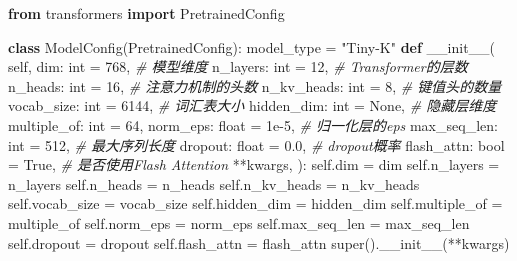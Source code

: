 \documentclass[
]{article}
\newenvironment{Shaded}{}{}
\newcommand{\BuiltInTok}[1]{\textcolor[rgb]{0.00,0.50,0.00}{#1}}
\newcommand{\CommentTok}[1]{\textcolor[rgb]{0.38,0.63,0.69}{\textit{#1}}}
\newcommand{\DecValTok}[1]{\textcolor[rgb]{0.25,0.63,0.44}{#1}}
\newcommand{\FloatTok}[1]{\textcolor[rgb]{0.25,0.63,0.44}{#1}}
\newcommand{\FunctionTok}[1]{\textcolor[rgb]{0.02,0.16,0.49}{#1}}
\newcommand{\ImportTok}[1]{\textcolor[rgb]{0.00,0.50,0.00}{\textbf{#1}}}
\newcommand{\KeywordTok}[1]{\textcolor[rgb]{0.00,0.44,0.13}{\textbf{#1}}}
\newcommand{\NormalTok}[1]{#1}
\newcommand{\OperatorTok}[1]{\textcolor[rgb]{0.40,0.40,0.40}{#1}}
\newcommand{\StringTok}[1]{\textcolor[rgb]{0.25,0.44,0.63}{#1}}
\newcommand{\VariableTok}[1]{\textcolor[rgb]{0.10,0.09,0.49}{#1}}
\begin{document}
\begin{Shaded}
\begin{Highlighting}[]
\ImportTok{from}\NormalTok{ transformers }\ImportTok{import}\NormalTok{ PretrainedConfig}

\KeywordTok{class}\NormalTok{ ModelConfig(PretrainedConfig):}
\NormalTok{    model\_type }\OperatorTok{=} \StringTok{"Tiny{-}K"}
    \KeywordTok{def} \FunctionTok{\_\_init\_\_}\NormalTok{(}
            \VariableTok{self}\NormalTok{,}
\NormalTok{            dim: }\BuiltInTok{int} \OperatorTok{=} \DecValTok{768}\NormalTok{, }\CommentTok{\# 模型维度}
\NormalTok{            n\_layers: }\BuiltInTok{int} \OperatorTok{=} \DecValTok{12}\NormalTok{, }\CommentTok{\# Transformer的层数}
\NormalTok{            n\_heads: }\BuiltInTok{int} \OperatorTok{=} \DecValTok{16}\NormalTok{, }\CommentTok{\# 注意力机制的头数}
\NormalTok{            n\_kv\_heads: }\BuiltInTok{int} \OperatorTok{=} \DecValTok{8}\NormalTok{, }\CommentTok{\# 键值头的数量}
\NormalTok{            vocab\_size: }\BuiltInTok{int} \OperatorTok{=} \DecValTok{6144}\NormalTok{, }\CommentTok{\# 词汇表大小}
\NormalTok{            hidden\_dim: }\BuiltInTok{int} \OperatorTok{=} \VariableTok{None}\NormalTok{, }\CommentTok{\# 隐藏层维度}
\NormalTok{            multiple\_of: }\BuiltInTok{int} \OperatorTok{=} \DecValTok{64}\NormalTok{, }
\NormalTok{            norm\_eps: }\BuiltInTok{float} \OperatorTok{=} \FloatTok{1e{-}5}\NormalTok{, }\CommentTok{\# 归一化层的eps}
\NormalTok{            max\_seq\_len: }\BuiltInTok{int} \OperatorTok{=} \DecValTok{512}\NormalTok{, }\CommentTok{\# 最大序列长度}
\NormalTok{            dropout: }\BuiltInTok{float} \OperatorTok{=} \FloatTok{0.0}\NormalTok{, }\CommentTok{\# dropout概率}
\NormalTok{            flash\_attn: }\BuiltInTok{bool} \OperatorTok{=} \VariableTok{True}\NormalTok{, }\CommentTok{\# 是否使用Flash Attention}
            \OperatorTok{**}\NormalTok{kwargs,}
\NormalTok{    ):}
        \VariableTok{self}\NormalTok{.dim }\OperatorTok{=}\NormalTok{ dim}
        \VariableTok{self}\NormalTok{.n\_layers }\OperatorTok{=}\NormalTok{ n\_layers}
        \VariableTok{self}\NormalTok{.n\_heads }\OperatorTok{=}\NormalTok{ n\_heads}
        \VariableTok{self}\NormalTok{.n\_kv\_heads }\OperatorTok{=}\NormalTok{ n\_kv\_heads}
        \VariableTok{self}\NormalTok{.vocab\_size }\OperatorTok{=}\NormalTok{ vocab\_size}
        \VariableTok{self}\NormalTok{.hidden\_dim }\OperatorTok{=}\NormalTok{ hidden\_dim}
        \VariableTok{self}\NormalTok{.multiple\_of }\OperatorTok{=}\NormalTok{ multiple\_of}
        \VariableTok{self}\NormalTok{.norm\_eps }\OperatorTok{=}\NormalTok{ norm\_eps}
        \VariableTok{self}\NormalTok{.max\_seq\_len }\OperatorTok{=}\NormalTok{ max\_seq\_len}
        \VariableTok{self}\NormalTok{.dropout }\OperatorTok{=}\NormalTok{ dropout}
        \VariableTok{self}\NormalTok{.flash\_attn }\OperatorTok{=}\NormalTok{ flash\_attn}
        \BuiltInTok{super}\NormalTok{().}\FunctionTok{\_\_init\_\_}\NormalTok{(}\OperatorTok{**}\NormalTok{kwargs)}
\end{Highlighting}
\end{Shaded}
\end{document}
